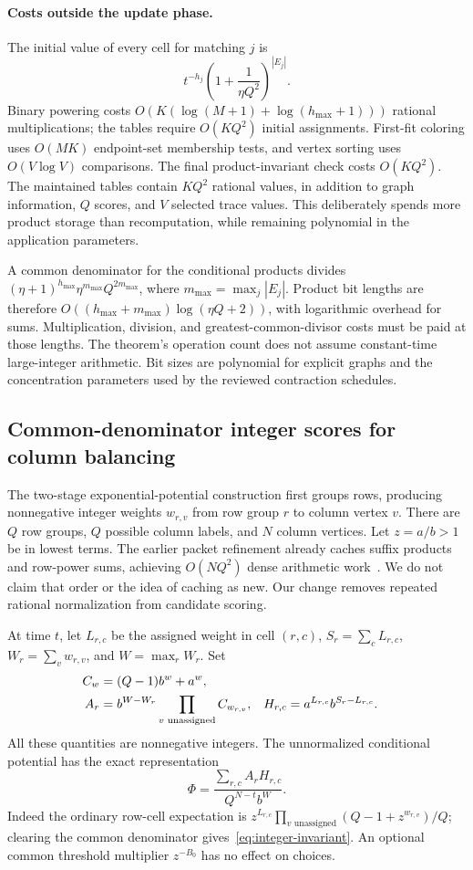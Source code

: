 \paragraph{Costs outside the update phase.}
The initial value of every cell for matching $j$ is
\[
 t^{-h_j}\left(1+\frac1{\eta Q^2}\right)^{|E_j|}.
\]
Binary powering costs
$O(K(\log(M+1)+\log(h_{\max}+1)))$ rational multiplications; the tables
require $O(KQ^2)$ initial assignments. First-fit coloring uses $O(MK)$
endpoint-set membership tests, and vertex sorting uses $O(V\log V)$
comparisons. The final product-invariant check costs $O(KQ^2)$.
The maintained tables contain $KQ^2$ rational values, in addition to graph
information, $Q$ scores, and $V$ selected trace values. This deliberately
spends more product storage than recomputation, while remaining polynomial
in the application parameters.

A common denominator for the conditional products divides
$(\eta+1)^{h_{\max}}\eta^{m_{\max}}Q^{2m_{\max}}$, where
$m_{\max}=\max_j|E_j|$. Product bit lengths are therefore
$O((h_{\max}+m_{\max})\log(\eta Q+2))$, with logarithmic overhead for sums.
Multiplication, division, and greatest-common-divisor costs must be paid at
those lengths. The theorem's operation count does not assume constant-time
large-integer arithmetic. Bit sizes are polynomial for explicit graphs and
the concentration parameters used by the reviewed contraction schedules.

\subsection{Common-denominator integer scores for column balancing}
The two-stage exponential-potential construction first groups rows, producing
nonnegative integer weights $w_{r,v}$ from row group $r$ to column vertex $v$.
There are $Q$ row groups, $Q$ possible column labels, and $N$ column vertices.
Let $z=a/b>1$ be in lowest terms. The earlier packet refinement already caches
suffix products and row-power sums, achieving $O(NQ^2)$ dense arithmetic
work~\cite{packet}. We do not claim that order or the idea of caching as new.
Our change removes repeated rational normalization from candidate scoring.

At time $t$, let $L_{r,c}$ be the assigned weight in cell $(r,c)$,
$S_r=\sum_cL_{r,c}$, $W_r=\sum_vw_{r,v}$, and $W=\max_rW_r$. Set
\begin{align}
 C_w&=(Q-1)b^w+a^w,\notag\\
 A_r&=b^{W-W_r}\prod_{v\text{ unassigned}}C_{w_{r,v}},
 &H_{r,c}&=a^{L_{r,c}}b^{S_r-L_{r,c}}.\label{eq:integer-state}
\end{align}
All these quantities are nonnegative integers. The unnormalized conditional
potential has the exact representation
\begin{equation}\label{eq:integer-invariant}
 \Phi=\frac{\sum_{r,c}A_rH_{r,c}}{Q^{N-t}b^W}.
\end{equation}
Indeed the ordinary row-cell expectation is
$z^{L_{r,c}}\prod_{v\text{ unassigned}}(Q-1+z^{w_{r,v}})/Q$;
clearing the common denominator gives~\eqref{eq:integer-invariant}.
An optional common threshold multiplier $z^{-B_0}$ has no effect on choices.

